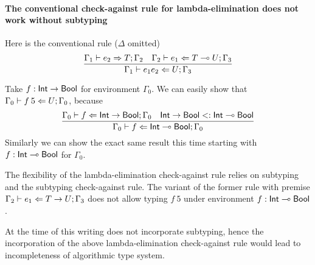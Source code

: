 
\paragraph{The conventional check-against rule for lambda-elimination
  does not work without subtyping}

Here is the  conventional rule ($\Delta$ omitted)
%
\begin{equation*}
    \frac{
      \algtypeout[\Gamma_1]{e_2}{T}{\Gamma_2}
      \quad
      \algtypein[\Gamma_2]{e_1}{T\multimap U}{\Gamma_3}
    }{
      \algtypein[\Gamma_1]{e_1e_2}{U}{\Gamma_3}
    }  
\end{equation*}

Take $f: \intt\rightarrow\boolt$ for environment $\Gamma_0$. We can
easily show that $\algtypein[\Gamma_0]{f\:5}{U}{\Gamma_0}$, because
%
\begin{equation*}
  \frac{
    \algtypein[\Gamma_0]{f}{\intt\rightarrow\boolt}{\Gamma_0}
    \quad
    \intt\rightarrow\boolt \subt \intt\multimap\boolt
  }{
    \algtypein[\Gamma_0]{f}{\intt\multimap\boolt}{\Gamma_0}
  }
\end{equation*}
%
Similarly we can show the exact same result this time starting with
$f: \intt\multimap\boolt$ for $\Gamma_0$.

The flexibility of the lambda-elimination check-against rule relies on
subtyping and the subtyping check-against rule. The variant of the
former rule with premise $\algtypein[\Gamma_2]{e_1}{T\rightarrow
  U}{\Gamma_3}$ does not allow typing $f\:5$ under environment $f:
\intt\multimap\boolt$.

At the time of this writing \freest does not incorporate subtyping,
hence the incorporation of the above  lambda-elimination check-against
rule would lead to incompleteness of algorithmic type system.

